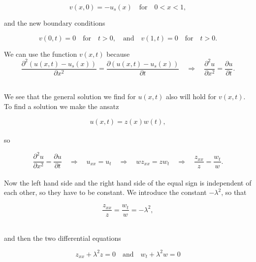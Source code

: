 \documentclass[12pt]{article}
\begin{document}
\begin{flushleft}
\vspace{5mm}
\begin{equation}\label{eq:initial_cond_v}
v(x,0) = -u_s(x)\quad\text{for}\quad 0<x<1,
\end{equation}
\vspace{5mm}

and the new boundary conditions 

\vspace{5mm}
\begin{equation}\label{eq:boundary_cond_v}
v(0,t) = 0\quad\text{for}\quad t>0,\quad\text{and}\quad v(1,t) = 0\quad\text{for}\quad t>0.
\end{equation}
\vspace{5mm}

We can use the function $v(x,t)$ because 
\vspace{5mm}
$$\frac{\partial^2 (u(x,t) - u_s(x))}{\partial x^2} = \frac{\partial (u(x,t) - u_s(x))}{\partial t}\quad\Rightarrow\quad \frac{\partial^2 u}{\partial x^2} = \frac{\partial u}{\partial t}.$$\\
\vspace{5mm}

We see that the general solution we find for $u(x,t)$ also will hold for $v(x,t)$. To find a solution we make the ansatz

\vspace{5mm}
$$u(x,t) = z(x)w(t),$$\\

so

$$\frac{\partial^2 u}{\partial x^2} = \frac{\partial u}{\partial t} \quad\Rightarrow\quad u_{xx} = u_t \quad\Rightarrow\quad wz_{xx} = zw_t \quad\Rightarrow\quad \frac{z_{xx}}{z} = \frac{w_t}{w}.$$\\
\vspace{5mm}
Now the left hand side and the right hand side of the equal sign is independent of each other, so they have to be constant. We introduce the constant $-\lambda^2$, so that

\vspace{5mm}
$$\frac{z_{xx}}{z} = \frac{w_t}{w} = -\lambda^2,$$\\
\vspace{5mm}

and then the two differential equations 

\vspace{5mm}
$$z_{xx} + \lambda^2 z = 0 \quad\text{and}\quad w_t + \lambda^2 w = 0$$\\
\vspace{5mm}


\end{flushleft}
\end{document}
